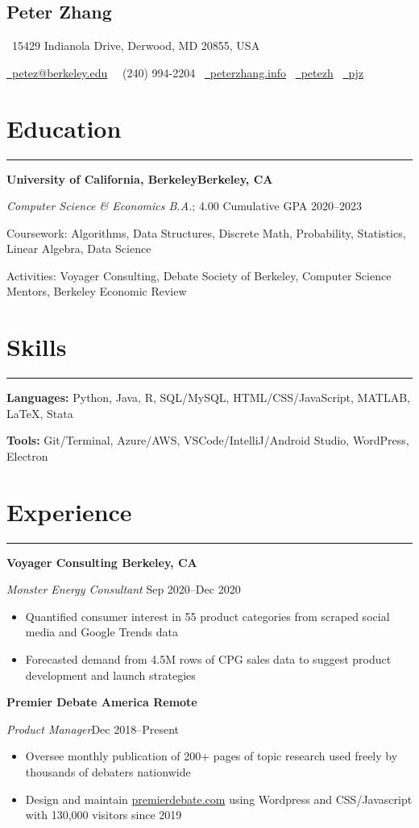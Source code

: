 \documentclass[11pt]{article}
\newcommand{\name}[1]{\begin{center}\section*{\huge \color{highlight} #1}\vspace{-0.5cm}\end{center}}
\newcommand{\topinfo}[1]{\begin{center}\vspace{-0.2cm}#1\vspace{-0.2cm}\end{center}}
\newcommand{\resumesection}[1]{\vspace{-0.6cm}\section*{\color{highlight}#1}\vspace{-0.3cm}\hrule\vspace{0.2cm}}
\begin{document}
\name{Peter Zhang}
\topinfo{\faHome \ 15429 Indianola Drive, Derwood, MD 20855, USA}
\topinfo{\href{mailto:petez@berkeley.edu}{\faEnvelope \ petez@berkeley.edu} \ \faPhone \ (240) 994-2204 \ \href{https://peterzhang.info/}{\faBriefcase \ peterzhang.info} \  \href{https://github.com/petezh}{\faGithub \ petezh} \  \href{https://www.linkedin.com/in/pjz/}{\faLinkedinSquare \ pjz}}

\resumesection{Education}

\textbf{University of California, Berkeley\hfill Berkeley, CA} \par
\textit{Computer Science \& Economics B.A.}; 4.00 Cumulative GPA \hfill 2020--2023\par
Coursework: Algorithms, Data Structures, Discrete Math, Probability, Statistics, Linear Algebra, Data Science\par
Activities: Voyager Consulting, Debate Society of Berkeley, Computer Science Mentors, Berkeley Economic Review

\resumesection{Skills}

\textbf{Languages:} Python, Java, R, SQL/MySQL, HTML/CSS/JavaScript, MATLAB, \LaTeX, Stata \par
\textbf{Tools:} Git/Terminal, Azure/AWS, VSCode/IntelliJ/Android Studio, WordPress, Electron

\resumesection{Experience}

\textbf{Voyager Consulting \hfill Berkeley, CA}\par

\textit{Monster Energy Consultant} \hfill Sep 2020--Dec 2020
\begin{itemize}
	\item Quantified consumer interest in 55 product categories from scraped social media and Google Trends data
	\item Forecasted demand from 4.5M rows of CPG sales data to suggest product development and launch strategies
\end{itemize}\par

\textbf{Premier Debate America \hfill Remote} \par

\textit{Product Manager}\hfill Dec 2018--Present
\begin{itemize}
	\item Oversee monthly publication of 200+ pages of topic research used freely by thousands of debaters nationwide
	\item Design and maintain \href{https://www.premierdebate.com/briefs/}{premierdebate.com} using Wordpress and CSS/Javascript with 130,000 visitors since 2019
\end{itemize}\vspace{0.1cm}
\end{document}
